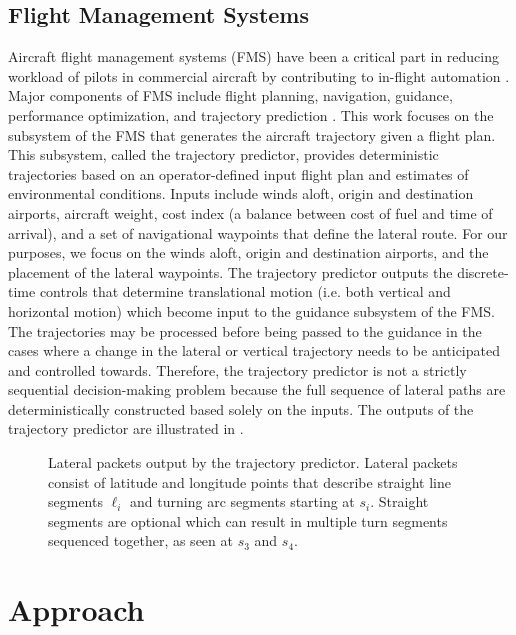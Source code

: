 \subsection{Flight Management Systems}
Aircraft flight management systems (FMS) have been a critical part in reducing workload of pilots in commercial aircraft by contributing to in-flight automation  \cite{fms_workload}.
Major components of FMS include flight planning, navigation, guidance, performance optimization, and trajectory prediction \cite{fms}. 
This work focuses on the subsystem of the FMS that generates the aircraft trajectory given a flight plan.
This subsystem, called the trajectory predictor, provides deterministic trajectories based on an operator-defined input flight plan and estimates of environmental conditions.
Inputs include winds aloft, origin and destination airports, aircraft weight, cost index (a balance between cost of fuel and time of arrival), and a set of navigational waypoints that define the lateral route.
For our purposes, we focus on the winds aloft, origin and destination airports, and the placement of the lateral waypoints.
The trajectory predictor outputs the discrete-time controls that determine translational motion (i.e. both vertical and horizontal motion) which become input to the guidance subsystem of the FMS.
The trajectories may be processed before being passed to the guidance in the cases where a change in the lateral or vertical trajectory needs to be anticipated and controlled towards.
Therefore, the trajectory predictor is not a strictly sequential decision-making problem because the full sequence of lateral paths are deterministically constructed based solely on the inputs.
The outputs of the trajectory predictor are illustrated in .

\begin{figure*}[!t]
\centering
\resizebox{0.78\textwidth}{!}{}
\caption{Lateral packets output by the trajectory predictor. Lateral packets consist of latitude and longitude points that describe straight line segments $\ell_i$ and turning arc segments starting at $s_i$. Straight segments are optional which can result in multiple turn segments sequenced together, as seen at $s_3$ and $s_4$.}
\label{fig:lateral_packets}
\end{figure*}



\section{Approach}
\label{sec:approach}

